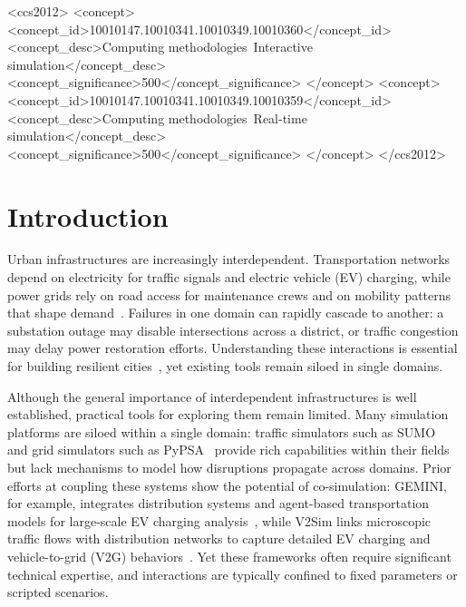 \documentclass[sigconf,anonymous,review]{acmart}
\begin{document}
\begin{CCSXML}
<ccs2012>
   <concept>
       <concept_id>10010147.10010341.10010349.10010360</concept_id>
       <concept_desc>Computing methodologies~Interactive simulation</concept_desc>
       <concept_significance>500</concept_significance>
       </concept>
   <concept>
       <concept_id>10010147.10010341.10010349.10010359</concept_id>
       <concept_desc>Computing methodologies~Real-time simulation</concept_desc>
       <concept_significance>500</concept_significance>
       </concept>
 </ccs2012>
\end{CCSXML}


\maketitle

\section{Introduction}

Urban infrastructures are increasingly interdependent. Transportation networks depend on electricity for traffic signals and electric vehicle (EV) charging, while power grids rely on road access for maintenance crews and on mobility patterns that shape demand~\cite{rinaldi2001identifying,ouyang2014review,buldyrev2010catastrophic,gao2012robustness,zio2011modeling}. Failures in one domain can rapidly cascade to another: a substation outage may disable intersections across a district, or traffic congestion may delay power restoration efforts. Understanding these interactions is essential for building resilient cities~\cite{rinaldi2001identifying, ouyang2014review, buldyrev2010catastrophic}, yet existing tools remain siloed in single domains.

Although the general importance of interdependent infrastructures is well established, practical tools for exploring them remain limited. Many simulation platforms are siloed within a single domain: traffic simulators such as SUMO~\cite{lopez2018sumo} and grid simulators such as PyPSA~\cite{brown2018pypsa} provide rich capabilities within their fields but lack mechanisms to model how disruptions propagate across domains. Prior efforts at coupling these systems show the potential of co-simulation: GEMINI, for example, integrates distribution systems and agent-based transportation models for large-scale EV charging analysis~\cite{panossian2023architecture}, while V2Sim links microscopic traffic flows with distribution networks to capture detailed EV charging and vehicle-to-grid (V2G) behaviors~\cite{qian2024v2sim}. Yet these frameworks often require significant technical expertise, and interactions are typically confined to fixed parameters or scripted scenarios.
\end{document}
